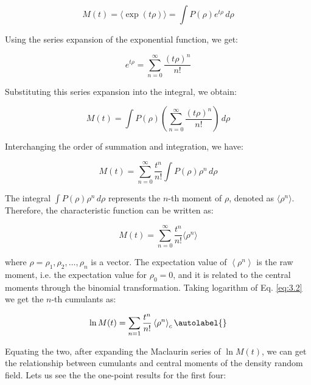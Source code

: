 \begin{equation}
    M(t) = \langle \exp(t \rho) \rangle = \int P(\rho) e^{t \rho} \, d\rho
\end{equation}

Using the series expansion of the exponential function, we get:

\begin{equation}
    e^{t \rho} = \sum_{n=0}^{\infty} \frac{(t \rho)^n}{n!}
\end{equation}

Substituting this series expansion into the integral, we obtain:

\begin{equation}
    M(t) = \int P(\rho) \left( \sum_{n=0}^{\infty} \frac{(t \rho)^n}{n!} \right) \, d\rho
\end{equation}

Interchanging the order of summation and integration, we have:

\begin{equation}
    M(t) = \sum_{n=0}^{\infty} \frac{t^n}{n!} \int P(\rho) \rho^n \, d\rho
\end{equation}

The integral \(\int P(\rho) \rho^n \, d\rho\) represents the \(n\)-th moment of \(\rho\), denoted as \(\langle \rho^n \rangle\). Therefore, the characteristic function can be written as:

\begin{equation}
    M(t) = \sum_{n=0}^{\infty} \frac{t^n}{n!} \langle \rho^n \rangle
\end{equation}




where $\rho=\rho_{1}, \rho_{2}, \ldots, \rho_{n}$ is a vector. The expectation value of $\left\langle\rho^{n}\right\rangle$ is the raw moment, i.e. the expectation value for $\rho_{0}=0$, and it is related to the central moments through the binomial transformation. Taking logarithm of Eq. \ref{eq:3.2} we get the $n$-th cumulants as:


\begin{equation}
    \ln M(t)=\sum_{n=1} \frac{t^{n}}{n!}\left\langle\rho^{n}\right\rangle_{c} \autolabel{}
\end{equation}


Equating the two, after expanding the Maclaurin series of $\ln M(t)$, we can get the relationship between cumulants and central moments of the density random field. Lets us see the the one-point results for the first four:


